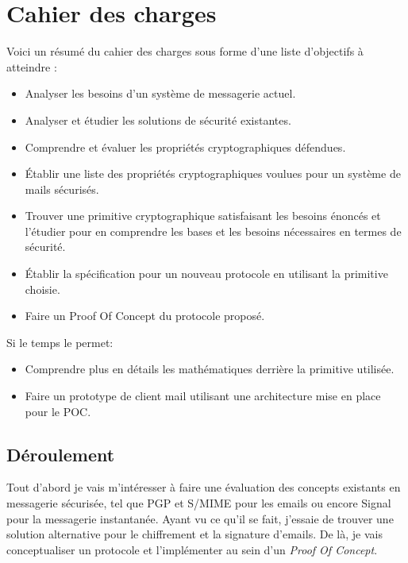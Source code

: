 \section*{Cahier des charges}
Voici un résumé du cahier des charges sous forme d'une liste d'objectifs à atteindre :
\begin{itemize}
	\item Analyser les besoins d’un système de messagerie actuel.
	\item Analyser et étudier les solutions de sécurité existantes.
	\item Comprendre et évaluer les propriétés cryptographiques défendues.
	\item Établir une liste des propriétés cryptographiques voulues pour un système de mails sécurisés.
	\item Trouver une primitive cryptographique satisfaisant les besoins énoncés et l’étudier pour en comprendre les bases et les besoins nécessaires en termes de sécurité.
	\item Établir la spécification pour un nouveau protocole en utilisant la primitive choisie.
	\item Faire un Proof Of Concept du protocole proposé.
\end{itemize}
Si le temps le permet: 
\begin{itemize}
	\item Comprendre plus en détails les mathématiques derrière la primitive utilisée.
	\item Faire un prototype de client mail utilisant une architecture mise en place pour le POC.
\end{itemize}


\subsection*{Déroulement}
Tout d'abord je vais m'intéresser à faire une évaluation des concepts existants en messagerie sécurisée, tel que PGP et S/MIME pour les emails ou encore Signal pour la messagerie instantanée. Ayant vu ce qu'il se fait, j'essaie de trouver une solution alternative pour le chiffrement et la signature d'emails. De là, je vais conceptualiser un protocole et l'implémenter au sein d'un \textit{Proof Of Concept}.
